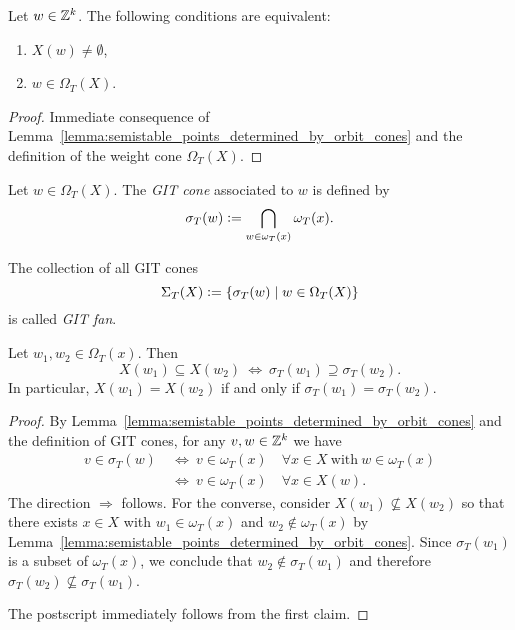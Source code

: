 \begin{coro} Let $w\in\mathbb{Z}^k$. The following conditions are equivalent:
	\begin{enumerate}[label={\upshape(\roman*)}]
	\item $X(w) \neq \emptyset$,
	\item $w\in\Omega_T(X)$.
	\end{enumerate}
\end{coro}
\begin{proof}
	Immediate consequence of Lemma~\ref{lemma:semistable_points_determined_by_orbit_cones} and the definition of the weight cone $\Omega_T(X)$.
\end{proof}

\begin{defi}
Let $w\in\Omega_T(X)$. The \emph{GIT cone} associated to $w$ is defined by
$$\sigma_T(w) \mathrel{\mathop:}= \bigcap_{w\in\omega_T(x)} \omega_T(x).$$
%

The collection of all GIT cones
$$\Sigma_T(X) \mathrel{\mathop:}= \{\sigma_T(w)\mid w\in\Omega_T(X)\}$$
is called \emph{GIT fan}.
%
\end{defi}

\begin{prop}
	\label{prop:equivalence_git_cones_semistable_points}
	Let $w_1, w_2\in \Omega_T(x)$. Then
	$$X(w_1)\subseteq X(w_2) \ \Longleftrightarrow\ \sigma_T(w_1) \supseteq \sigma_T(w_2).$$
	In particular, $X(w_1) = X(w_2)$ if and only if $\sigma_T(w_1) = \sigma_T(w_2)$.
\end{prop}
\begin{proof}
	By Lemma~\ref{lemma:semistable_points_determined_by_orbit_cones} and the definition of GIT cones, for any $v,w\in\mathbb{Z}^k$ we have
	\begin{align*}
		v\in\sigma_T(w) &\ \Leftrightarrow\ v\in \omega_T(x)\quad \forall x\in X\ \mathrm{with}\ w\in\omega_T(x) \\
		&\ \Leftrightarrow\ v\in \omega_T(x)\quad \forall x\in X(w).
	\end{align*}
	The direction $\Rightarrow$ follows. For the converse, consider $X(w_1) \nsubseteq X(w_2)$ so that there exists $x\in X$ with $w_1\in \omega_T(x)$ and $w_2\notin \omega_T(x)$ by Lemma~\ref{lemma:semistable_points_determined_by_orbit_cones}. Since $\sigma_T(w_1)$ is a subset of $\omega_T(x)$, we conclude that $w_2\notin\sigma_T(w_1)$ and therefore $\sigma_T(w_2)\nsubseteq\sigma_T(w_1)$.
	
	The postscript immediately follows from the first claim.
\end{proof}


